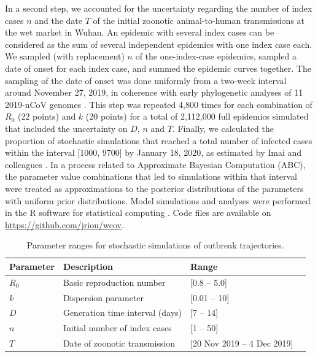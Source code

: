 \documentclass{article}
\begin{document}
In a second step, we accounted for the uncertainty regarding the number of index cases $n$ and the date $T$ of the initial zoonotic animal-to-human transmissions at the wet market in Wuhan. 
An epidemic with several index cases can be considered as the sum of several independent epidemics with one index case each.
We sampled (with replacement) $n$ of the one-index-case epidemics, sampled a date of onset for each index case, and summed the epidemic curves together.
The sampling of the date of onset was done uniformly from a two-week interval around November 27, 2019, in coherence with early phylogenetic analyses of 11 2019-nCoV genomes \cite{Rambaut:2020}.
This step was repeated 4,800 times for each combination of $R_0$ (22 points) and $k$ (20 points) for a total of 2,112,000 full epidemics simulated that included the uncertainty on $D$, $n$ and $T$.
Finally, we calculated the proportion of stochastic simulations that reached a total number of infected cases within the interval [1000, 9700] by January 18, 2020, as estimated by Imai and colleagues \cite{Imai:2020}.
In a process related to Approximate Bayesian Computation (ABC), the parameter value combinations that led to simulations within that interval were treated as approximations to the posterior distributions of the parameters with uniform prior distributions.
Model simulations and analyses were performed in the R software for statistical computing \cite{R:2018}.
Code files are available on \url{https://github.com/jriou/wcov}.

\begin{table}
	\centering
	\caption{Parameter ranges for stochastic simulations of outbreak trajectories.}
	\label{fig:tab1}
\begin{tabular}{llll}
	\hline
	Parameter & Description & Range   \\
	\hline 
	$R_0$& Basic reproduction number  &[0.8 -- 5.0] \\ 
	$k$ & Dispersion parameter & [0.01 -- 10] \\
	$D$ & Generation time interval (days)	 & [7 -- 14]  \\
	$n$ & Initial number of index cases & [1 -- 50]  \\
	$T$ & Date of zoonotic transmission & [20 Nov 2019 -- 4 Dec 2019] \\
	
	\hline 
\end{tabular} 
\end{table}
\end{document}
